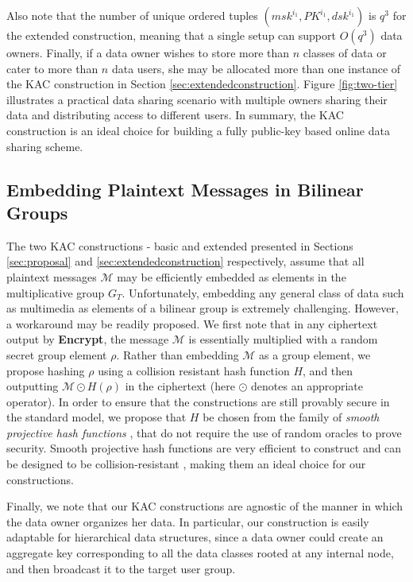 \noindent Also note that the number of unique ordered tuples $\left(msk^{i_1},PK^{i_1},dsk^{i_1}\right)$ is $q^3$ for the extended construction, meaning that a single setup can support $O(q^3)$ data owners. Finally, if a data owner wishes to store more than $n$ classes of data or cater to more than $n$ data users, she may be allocated more than one instance of the KAC construction in Section \ref{sec:extendedconstruction}. Figure \ref{fig:two-tier} illustrates a practical data sharing scenario with multiple owners sharing their data and distributing access to different users. In summary, the KAC construction is an ideal choice for building a fully public-key based online data sharing scheme.


\subsection{Embedding Plaintext Messages in Bilinear Groups}
\label{subsec:embedding}

The two KAC constructions - basic and extended presented in Sections \ref{sec:proposal} and \ref{sec:extendedconstruction} respectively, assume that all plaintext messages $\mathcal{M}$ may be efficiently embedded as elements in the multiplicative group $G_T$. Unfortunately, embedding any general class of data such as multimedia as elements of a bilinear group is extremely challenging. However, a workaround may be readily proposed. We first note that in any ciphertext output by \textbf{Encrypt}, the message $\mathcal{M}$ is essentially multiplied with a random secret group element $\rho$. Rather than embedding $\mathcal{M}$ as a group element, we propose hashing $\rho$ using a collision resistant hash function $H$, and then outputting $\mathcal{M}\odot H(\rho)$ in the ciphertext (here $\odot$ denotes an appropriate operator). In order to ensure that the constructions are still provably secure in the standard model, we propose that $H$ be chosen from the family of \emph{smooth projective hash functions} \cite{cramer2002universal}, that do not require the use of random oracles to prove security. Smooth projective hash functions are very efficient to construct and can be designed to be collision-resistant \cite{abdalla2009smooth}, making them an ideal choice for our constructions.



Finally, we note that our KAC constructions are agnostic of the manner in which the data owner organizes her data. In particular, our construction is easily adaptable for hierarchical data structures, since a data owner could create an aggregate key corresponding to all the data classes rooted at any internal node, and then broadcast it to the target user group.


  


